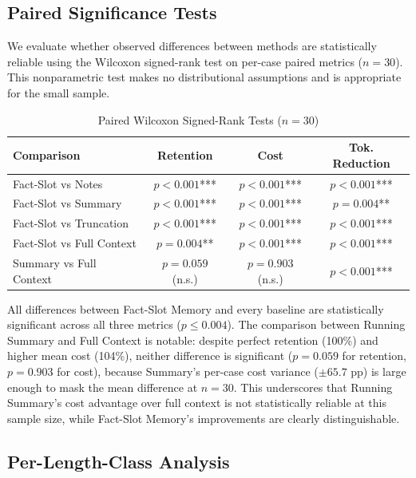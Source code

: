 \documentclass[conference]{IEEEtran}
\begin{document}
\subsection{Paired Significance Tests}

We evaluate whether observed differences between methods are statistically reliable using the Wilcoxon signed-rank test on per-case paired metrics ($n=30$). This nonparametric test makes no distributional assumptions and is appropriate for the small sample.

\begin{table}[h]
\centering
\caption{Paired Wilcoxon Signed-Rank Tests ($n=30$)}
\label{tab:significance}
\small
\setlength{\tabcolsep}{3pt}
\begin{tabular}{lccc}
\toprule
\textbf{Comparison} & \textbf{Retention} & \textbf{Cost} & \textbf{Tok. Reduction} \\
\midrule
Fact-Slot vs Notes & $p < 0.001$*** & $p < 0.001$*** & $p < 0.001$*** \\
Fact-Slot vs Summary & $p < 0.001$*** & $p < 0.001$*** & $p = 0.004$** \\
Fact-Slot vs Truncation & $p < 0.001$*** & $p < 0.001$*** & $p < 0.001$*** \\
Fact-Slot vs Full Context & $p = 0.004$** & $p < 0.001$*** & $p < 0.001$*** \\
Summary vs Full Context & $p = 0.059$ (n.s.) & $p = 0.903$ (n.s.) & $p < 0.001$*** \\
\bottomrule
\end{tabular}
\end{table}

All differences between Fact-Slot Memory and every baseline are statistically significant across all three metrics ($p \leq 0.004$). The comparison between Running Summary and Full Context is notable: despite perfect retention (100\%) and higher mean cost (104\%), neither difference is significant ($p = 0.059$ for retention, $p = 0.903$ for cost), because Summary's per-case cost variance ($\pm 65.7$ pp) is large enough to mask the mean difference at $n=30$. This underscores that Running Summary's cost advantage over full context is not statistically reliable at this sample size, while Fact-Slot Memory's improvements are clearly distinguishable.

\subsection{Per-Length-Class Analysis}
\end{document}
